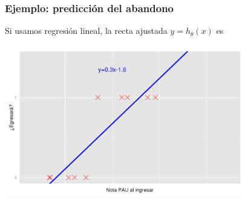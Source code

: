 \documentclass{beamer}
\begin{document}
 \begin{frame}\frametitle{Ejemplo: predicción del abandono}
   \begin{overlayarea}{\textwidth}{0.6cm}
   Si usamos regresión lineal, la recta ajustada $y=h_\theta(x)$ es 
 \end{overlayarea}
 \begin{center}
  \includegraphics[height=6.6cm]{egresara3.png}
\end{center}
  \end{frame}
  
\end{document}
